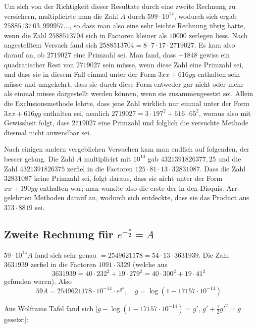 \documentclass[10pt,a4paper]{article}
\begin{document}
Um sich von der Richtigkeit dieser Resultate durch eine zweite Rechnung
zu versichern, multiplicirte man die Zahl $A$ durch $599\cdot10^{14}$, wodurch sich ergab
$25885137\,03{,}999957\ldots$, so dass man also eine sehr leichte Rechnung übrig hatte,
wenn die Zahl $2588513704$ sich in Factoren kleiner als $10000$ zerlegen liess.
Nach angestelltem Versuch fand sich $2588513704 = 8\cdot7\cdot17\cdot2719027$.
Es kam also darauf an, ob $2719027$ eine Primzahl sei. Man fand, dass $-1848$ gewiss
ein quadratischer Rest von $2719027$ sein müsse, wenn diese Zahl eine Primzahl
sei, und dass sie in diesem Fall einmal unter der Form $3xx+616yy$ enthalten
sein müsse und umgekehrt, dass sie durch diese Form entweder gar nicht oder
mehr als einmal müsse dargestellt werden können, wenn sie zusammengesetzt sei.
Allein die Exclusionsmethode lehrte, dass jene Zahl wirklich nur einmal unter
der Form $3xx+616yy$ enthalten sei, nemlich $2719027 = 3\cdot197^2+616\cdot65^2$,
woraus also mit Gewissheit folgt, dass $2719027$ eine Primzahl und folglich die
versuchte Methode diesmal nicht anwendbar sei.

Nach einigen andern vergeblichen Versuchen kam man endlich auf folgenden, der besser gelang. Die Zahl $A$ multiplicirt mit $10^{14}$ gab $4321391826377{,}25$
und die Zahl $4321391826375$ zerfiel in die Factoren $125\cdot81\cdot13\cdot32831087$. Dass
die Zahl $32831087$ keine Primzahl sei, folgt daraus, dass sie nicht unter der
Form $xx+190yy$ enthalten war; man wandte also die erste der in den Disquis.
Arr. gelehrten Methoden darauf an, wodurch sich entdeckte, dass sie das Product aus $373\cdot8819$ sei.

\subsection*{Zweite Rechnung für \texorpdfstring{$e^{-\frac{\pi}{2}}=A$}{e\^{}(-pi/2)=A}}

$59\cdot10^{14}A$ fand sich sehr genau $=2549621178 = 54\cdot13\cdot3631939$. Die Zahl
$3631939$ zerfiel in die Factoren $1091\cdot3329$ (welche aus
\[
3631939 = 40\cdot232^2+19\cdot279^2 = 40\cdot300^2+19\cdot41^2
\]
gefunden waren). Also
\[
59A = 2549621178\cdot10^{-14}\cdot e^{g''}, \quad g = \log(1-17157\cdot10^{-14})
\]

Aus Wolframs Tafel fand sich [$g-\log(1-17157\cdot10^{-14})=g'$, $g'+\tfrac12g'^2=g$ gesetzt]:
\end{document}
